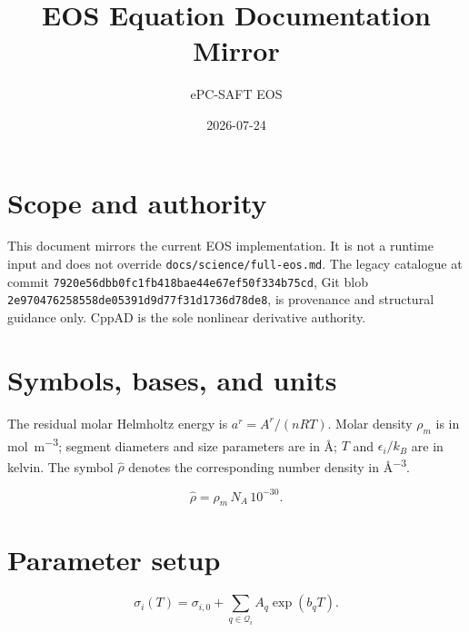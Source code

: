 \documentclass[11pt]{article}
\title{EOS Equation Documentation Mirror}
\author{ePC-SAFT EOS}
\date{2026-07-24}
\begin{document}
\maketitle

\section{Scope and authority}

This document mirrors the current EOS implementation. It is not a runtime
input and does not override \texttt{docs/science/full-eos.md}. The
legacy catalogue at commit
\texttt{7920e56dbb0fc1fb418bae44e67ef50f334b75cd}, Git blob
\texttt{2e970476258558de05391d9d77f31d1736d78de8}, is provenance and structural
guidance only. CppAD is the sole nonlinear derivative authority.

\section{Symbols, bases, and units}

The residual molar Helmholtz energy is
$a^r=A^r/(nRT)$. Molar density $\rho_m$ is in
\si{\mole\per\meter\cubed}; segment diameters and size parameters are in
\si{\angstrom}; $T$ and $\epsilon_i/k_B$ are in kelvin. The symbol
$\widehat{\rho}$ denotes the corresponding number density in
\si{\angstrom\tothe{-3}}.

\begin{equation}
\widehat{\rho}=\rho_m\,N_A\,10^{-30}.
\label{eq:angstrom_number_density}
\end{equation}

\section{Parameter setup}

\begin{equation}
\sigma_i(T)=\sigma_{i,0}+\sum_{q\in\mathcal{Q}_i} A_q\exp(b_qT).
\label{eq:segment_sigma_correlation}
\end{equation}
\end{document}
